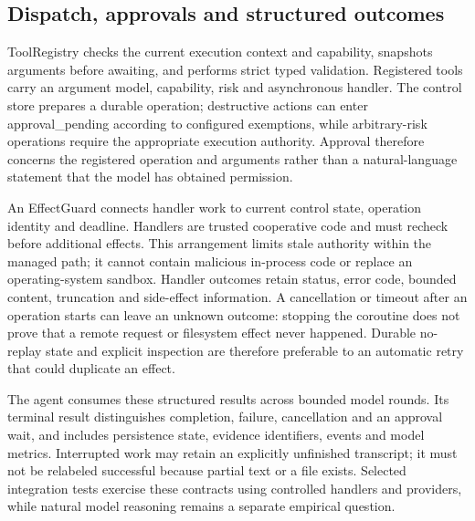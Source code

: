 \subsection{Dispatch, approvals and structured outcomes}
ToolRegistry checks the current execution context and capability, snapshots arguments before awaiting, and performs strict typed validation. Registered tools carry an argument model, capability, risk and asynchronous handler. The control store prepares a durable operation; destructive actions can enter approval\_pending according to configured exemptions, while arbitrary-risk operations require the appropriate execution authority. Approval therefore concerns the registered operation and arguments rather than a natural-language statement that the model has obtained permission.

An EffectGuard connects handler work to current control state, operation identity and deadline. Handlers are trusted cooperative code and must recheck before additional effects. This arrangement limits stale authority within the managed path; it cannot contain malicious in-process code or replace an operating-system sandbox. Handler outcomes retain status, error code, bounded content, truncation and side-effect information. A cancellation or timeout after an operation starts can leave an unknown outcome: stopping the coroutine does not prove that a remote request or filesystem effect never happened. Durable no-replay state and explicit inspection are therefore preferable to an automatic retry that could duplicate an effect.

The agent consumes these structured results across bounded model rounds. Its terminal result distinguishes completion, failure, cancellation and an approval wait, and includes persistence state, evidence identifiers, events and model metrics. Interrupted work may retain an explicitly unfinished transcript; it must not be relabeled successful because partial text or a file exists. Selected integration tests exercise these contracts using controlled handlers and providers, while natural model reasoning remains a separate empirical question.

